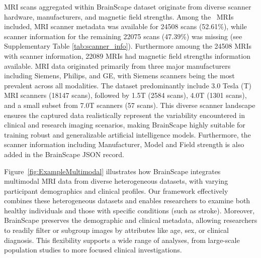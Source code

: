 MRI scans aggregated within BrainScape dataset originate from diverse scanner hardware, manufacturers, and magnetic field strengths. 
Among the \TotalNumMRIs\ MRIs included, MRI scanner metadata was available for 24508 scans (52.61\%), 
while scanner information for the remaining 22075 scans (47.39\%) was missing (see Supplementary Table \ref{tab:scanner_info}). 
Furthermore amoung the 24508 MRIs with scanner information, 22089 MRIs had magnetic field strengths information available.
MRI data originated primarily from three major manufacturers including Siemens, Philips, and GE, 
with Siemens scanners being the most prevalent across all modalities. 
The dataset predominantly include 3.0 Tesla (T) MRI scanners (18147 scans), followed by 1.5T (2584 scans), 
4.0T (1301 scans), and a small subset from 7.0T scanners (57 scans). 
This diverse scanner landscape ensures the captured data realistically represent the variability encountered in clinical and research imaging scenarios, 
making BrainScape highly suitable for training robust and generalizable artificial intelligence models.
Furthermore, the scanner information including Manufacturer, Model and Field strength is also 
added in the BrainScape JSON record. 

Figure~\ref{fig:ExampleMultimodal} illustrates how BrainScape integrates multimodal MRI data 
from diverse heterogeneous datasets, with varying participant demographics and clinical profiles. 
Our framework effectively combines these heterogeneous datasets and enables researchers 
to examine both healthy individuals and those with specific conditions (such as stroke). 
Moreover, BrainScape preserves the demographic and clinical metadata, allowing researchers 
to readily filter or subgroup images by attributes like age, sex, or clinical diagnosis. 
This flexibility supports a wide range of analyses, from large-scale population studies 
to more focused clinical investigations.

